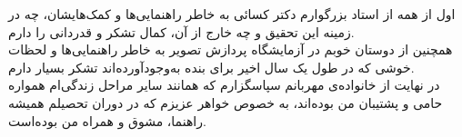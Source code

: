 


اول از همه از استاد بزرگوارم دکتر کسائی به خاطر راهنمایی‌ها و کمک‌هایشان، چه در زمینه این تحقیق و چه خارج از آن، کمال تشکر و قدردانی را دارم. \\

همچنین از دوستان خوبم در آزمایشگاه پردازش تصویر به خاطر راهنمایی‌ها و لحظات خوشی که در طول یک سال اخیر برای بنده به‌وجودآورده‌اند تشکر بسیار دارم. \\

در نهایت از خانواده‌ی مهربانم سپاسگزارم که همانند سایر مراحل زندگی‌ام همواره حامی و پشتیبان من بوده‌اند، به خصوص خواهر عزیزم که در دوران تحصیلم همیشه راهنما، مشوق و همراه من بوده‌است.


\pagebreak
